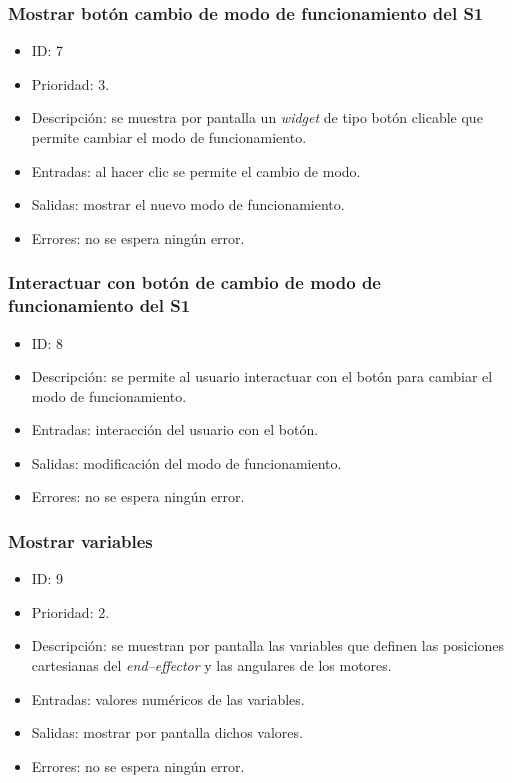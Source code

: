 \subsubsection{Mostrar botón cambio de modo de funcionamiento del \ac{S1}}
\begin{itemize}
    \item ID: 7
    \item Prioridad: 3.
    \item Descripción: se muestra por pantalla un \textit{widget} de tipo botón clicable que permite cambiar el modo de funcionamiento. 
    \item Entradas: al hacer clic se permite el cambio de modo.
    \item Salidas: mostrar el nuevo modo de funcionamiento.
    \item Errores: no se espera ningún error.
\end{itemize}

\subsubsection{Interactuar con botón de cambio de modo de funcionamiento del \ac{S1}}
\begin{itemize}
    \item ID: 8
    \item Descripción: se permite al usuario interactuar con el botón para cambiar el modo de funcionamiento.
    \item Entradas: interacción del usuario con el botón.
    \item Salidas: modificación del modo de funcionamiento.
    \item Errores: no se espera ningún error.
\end{itemize}

\subsubsection{Mostrar variables}
\begin{itemize}
    \item ID: 9
    \item Prioridad: 2.
    \item Descripción: se muestran por pantalla las variables que definen las posiciones cartesianas del \textit{end--effector} y las angulares de los motores.
    \item Entradas: valores numéricos de las variables.
    \item Salidas: mostrar por pantalla dichos valores.
    \item Errores: no se espera ningún error.
\end{itemize}


